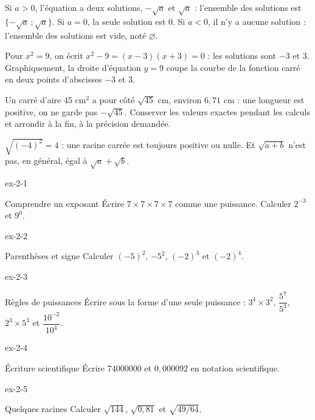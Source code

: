 \begin{propriete}[Résoudre $x^2=a$]Si $a>0$, l’équation a deux solutions, $-\sqrt a$ et $\sqrt a$ : l’ensemble des solutions est $\{-\sqrt a\,;\sqrt a\}$. Si $a=0$, la seule solution est 0. Si $a<0$, il n’y a aucune solution : l’ensemble des solutions est vide, noté $\varnothing$.\end{propriete}
\begin{exemple}Pour $x^2=9$, on écrit $x^2-9=(x-3)(x+3)=0$ : les solutions sont $-3$ et 3. Graphiquement, la droite d’équation $y=9$ coupe la courbe de la fonction carré en deux points d’abscisses $-3$ et 3.\end{exemple}
\begin{savoirfaire}Un carré d’aire 45 cm$^2$ a pour côté $\sqrt{45}$ cm, environ $6{,}71$ cm : une longueur est positive, on ne garde pas $-\sqrt{45}$. Conserver les valeurs exactes pendant les calculs et arrondir à la fin, à la précision demandée.\end{savoirfaire}
\begin{attention}$\sqrt{(-4)^2}=4$ : une racine carrée est toujours positive ou nulle. Et $\sqrt{a+b}$ n’est pas, en général, égal à $\sqrt a+\sqrt b$.\end{attention}
\clearpage{}
\begin{blocLivre}{ex-2-1}\begin{exercice}[1]{Comprendre un exposant}
Écrire $7\times7\times7\times7$ comme une puissance. Calculer $2^{-3}$ et $9^0$.
\end{exercice}\end{blocLivre}
\begin{blocLivre}{ex-2-2}\begin{exercice}[1]{Parenthèses et signe}
Calculer $(-5)^2$, $-5^2$, $(-2)^3$ et $(-2)^4$.
\end{exercice}\end{blocLivre}
\begin{blocLivre}{ex-2-3}\begin{exercice}[1]{Règles de puissances}
Écrire sous la forme d’une seule puissance : $3^4\times3^2$, $\dfrac{5^7}{5^3}$, $2^3\times5^3$ et $\dfrac{10^{-2}}{10^{4}}$.
\end{exercice}\end{blocLivre}
\begin{blocLivre}{ex-2-4}\begin{exercice}[1]{Écriture scientifique}
Écrire $74000000$ et $0{,}000092$ en notation scientifique.
\end{exercice}\end{blocLivre}
\begin{blocLivre}{ex-2-5}\begin{exercice}[1]{Quelques racines}
Calculer $\sqrt{144}$, $\sqrt{0{,}81}$ et $\sqrt{49/64}$.
\end{exercice}\end{blocLivre}

